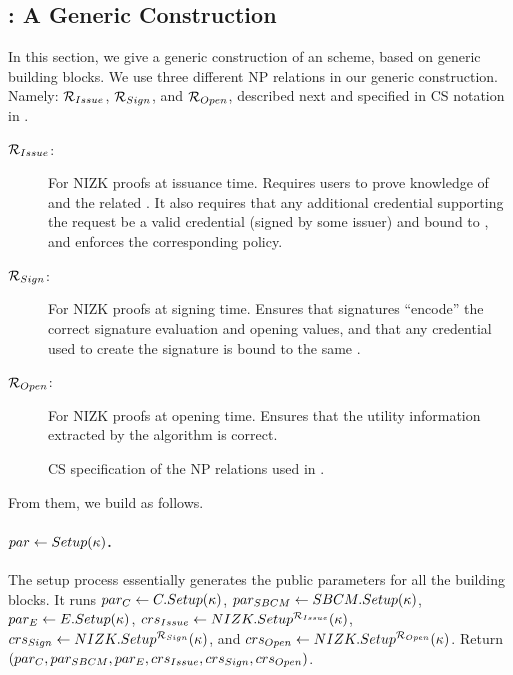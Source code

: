 \subsection{\CUASGen: A Generic \UAS Construction}
\label{ssec:generic-construction-uas}

In this section, we give a generic construction of an \UAS scheme, based on
generic building blocks. We use three different NP relations in our generic
construction. Namely: $\mathcal{R}_{Issue}$, $\mathcal{R}_{Sign}$, and
$\mathcal{R}_{Open}$, described next and specified in CS notation \needcite
in .

\begin{description}
\item[$\mathcal{R}_{Issue}$:] For NIZK proofs at issuance time. Requires users to
  prove knowledge of \usk and the related \upk. It also requires that any
  additional credential supporting the request be a valid credential (signed by
  some issuer) and bound to \upk, and enforces the corresponding \fissue policy.
\item[$\mathcal{R}_{Sign}$:] For NIZK proofs at signing time. Ensures that
  signatures ``encode'' the correct signature evaluation and opening values, and
  that any credential used to create the signature is bound to the same \upk.
\item[$\mathcal{R}_{Open}$:] For NIZK proofs at opening time. Ensures that the
  utility information extracted by the \Open algorithm is correct.
\end{description}

\begin{figure}[ht!]
  \centering
  \scalebox{0.9}{
    
  }
  \caption{CS specification of the NP relations used in \CUASGen.}
  \label{fig:nizkrels}
\end{figure}

From them, we build \CUASGen as follows.

\paragraph{$par \gets Setup(\kappa)$.} %
The setup process essentially generates the public parameters for all the
building blocks. It runs $par_C \gets C.Setup(\kappa)$, $par_{SBCM} \gets
SBCM.Setup(\kappa)$, $par_{E} \gets E.Setup(\kappa)$, $crs_{Issue} \gets
NIZK.Setup^{\mathcal{R}_{Issue}}(\kappa)$, $crs_{Sign} \gets
NIZK.Setup^{\mathcal{R}_{Sign}}(\kappa)$, and $crs_{Open} \gets
NIZK.Setup^{\mathcal{R}_{Open}}(\kappa)$. Return $(par_C,par_{SBCM},par_{E},
crs_{Issue},crs_{Sign},crs_{Open})$.

